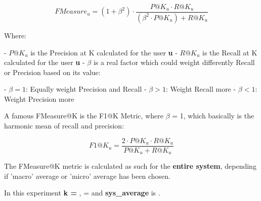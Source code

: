 \documentclass[12pt, a4paper]{article}
\begin{document}
    \[
    FMeasure_u = (1 + \beta^2) \cdot \frac{P@K_u \cdot R@K_u}{(\beta^2 \cdot P@K_u) + R@K_u}
    \]

    Where:

    - $P@K_u$ is the Precision at K calculated for the user \textbf{u}
    - $R@K_u$ is the Recall at K calculated for the user \textbf{u}
    - $\beta$ is a real factor which could weight differently Recall or Precision based on its value:

        - $\beta = 1$: Equally weight Precision and Recall
        - $\beta > 1$: Weight Recall more
        - $\beta < 1$: Weight Precision more

    A famous FMeasure@K is the F1@K Metric, where $\beta$ = 1, which basically is the harmonic mean of recall and
    precision:
    \hfill\break\hfill\break


    \[
    F1@K_u = \frac{2 \cdot P@K_u \cdot R@K_u}{P@K_u + R@K_u}
    \]

    The FMeasure@K metric is calculated as such for the \textbf{entire system}, depending if 'macro' average or 'micro'
    average has been chosen.


\hfill\break
\hfill\break
In this experiment \textbf{k = },
\text{\boldmath$\beta$} = \textbf{} and
\textbf{sys\_average} is \textbf{}.


\newpage
\end{document}
